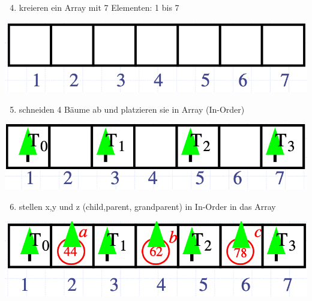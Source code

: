 \begin{enumerate}
    \setcounter{enumi}{3}
    \item kreieren ein Array mit 7 Elementen: 1 bis 7
\end{enumerate}
\vspace{-8pt}
\begin{center}
    \includegraphics[scale=.2]{graphic/02 AVLTrees/Cut-Link2.png}
\end{center}
\vspace{-8pt}

\begin{enumerate}
    \setcounter{enumi}{4}
    \item schneiden 4 Bäume ab und platzieren sie in Array (In-Order)
\end{enumerate}
\vspace{-8pt}
\begin{center}
    \includegraphics[scale=.2]{graphic/02 AVLTrees/Cut-Link3.png}
\end{center}
\vspace{-8pt}

\begin{enumerate}
    \setcounter{enumi}{5}
    \item stellen x,y und z (child,parent, grandparent) in In-Order in das Array
\end{enumerate}
\vspace{-8pt}
\begin{center}
    \includegraphics[scale=.2]{graphic/02 AVLTrees/Cut-Link4.png}
\end{center}
\vspace{-8pt}

